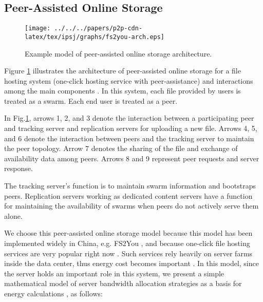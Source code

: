 \subsection{Peer-Assisted Online Storage}

\begin{figure}[tb]
\begin{center}
\texttt{[image: ../../../papers/p2p-cdn-latex/tex/ipsj/graphs/fs2you-arch.eps]}
\end{center}
\caption{Example model of peer-assisted online storage architecture.}
\label{fig:fs2you-arch}
\end{figure} 

Figure \ref{fig:fs2you-arch} illustrates the architecture of peer-assisted online storage for a file hosting system (one-click hosting service with peer-assistance) and interactions among the main components \cite{5061997}. 
In this system, each file provided by users is treated as a swarm. Each end user is treated as a peer.

In Fig.\ref{fig:fs2you-arch}, arrows 1, 2, and 3 denote the interaction between a participating peer and tracking server and replication servers for uploading a new file. 
Arrows 4, 5, and 6 denote the interaction between peers and the tracking server to maintain the peer topology. 
Arrow 7 denotes the sharing of the file and exchange of availability data among peers. 
Arrows 8 and 9 represent peer requests and server response.

The tracking server’s function is to maintain swarm information and bootstraps peers. 
Replication servers working as dedicated content servers have a function for maintaining the availability of swarms when peers do not actively serve them alone. 

We choose this peer-assisted online storage model because this model has been implemented widely in China, e.g. FS2You \cite{fs2you}, and because one-click file hosting services are very popular right now \cite{Mahanti:2011:MAC:1963192.1963346}. 
Such services rely heavily on server farms inside the data center, thus energy cost becomes important \cite{arstechnica}. 
In this model, since the server holds an important role in this system, we present a simple mathematical model of server bandwidth allocation strategies as a basis for energy calculations \cite{4199285,Sun:2009:POS:1542245.1542249}, as follows: 

